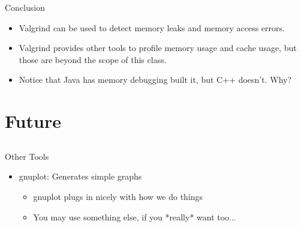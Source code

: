 \documentclass{beamer}
\begin{document}
\begin{frame}{Conclusion}
\begin{itemize}
\item Valgrind can be used to detect memory leaks and memory access errors.
\item Valgrind provides other tools to profile memory usage and cache usage, but those are beyond the scope of this class.
\item Notice that Java has memory debugging built it, but C++ doesn't.  Why?
\end{itemize}
\end{frame}

\section{Future}
\subsection{}

\begin{frame}{Other Tools}
\begin{itemize}
\item gnuplot: Generates simple graphs
\begin{itemize}
\item gnuplot plugs in nicely with how we do things
\item You may use something else, if you *really* want too...
\end{itemize}
\end{itemize}
\end{frame}
\end{document}
